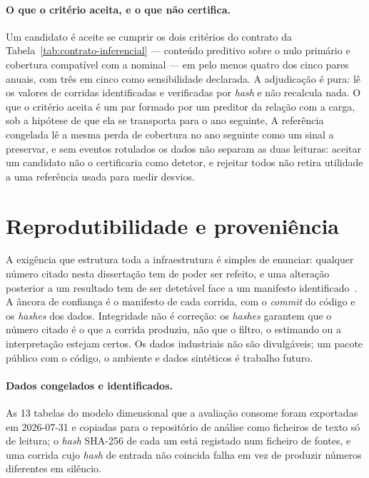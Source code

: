 \paragraph{O que o critério aceita, e o que não certifica.} Um candidato é
aceite se cumprir os dois critérios do contrato da
Tabela~\ref{tab:contrato-inferencial} --- conteúdo preditivo sobre o nulo
primário e cobertura compatível com a nominal --- em pelo menos quatro dos
cinco pares anuais, com três em cinco como sensibilidade declarada. A
adjudicação é pura: lê os valores de corridas identificadas e verificadas por
\emph{hash} e não recalcula nada. O que o critério aceita é um par formado
por um preditor da relação com a carga, sob a hipótese de que ela se
transporta para o ano seguinte,  A referência congelada lê a mesma perda de cobertura no ano
seguinte como um sinal a preservar, e sem eventos rotulados os dados não
separam as duas leituras: aceitar um candidato não o certificaria como
detetor, e rejeitar todos não retira utilidade a uma referência usada para
medir desvios.

\section{Reprodutibilidade e proveniência}
\label{sec:reprodutibilidade}

A exigência que estrutura toda a infraestrutura é simples de enunciar:
qualquer número citado nesta dissertação tem de poder ser refeito, e uma
alteração posterior a um resultado tem de ser detetável face a um manifesto
identificado~\cite{Peng2011,Sandve2013}. A âncora de confiança é o manifesto
de cada corrida, com o \emph{commit} do código e os \emph{hashes} dos dados.
Integridade não é correção: os \emph{hashes} garantem que o número citado é o
que a corrida produziu, não que o filtro, o estimando ou a interpretação
estejam certos. Os dados industriais não são divulgáveis; um pacote público
com o código, o ambiente e dados sintéticos é trabalho futuro.

\paragraph{Dados congelados e identificados.} As 13 tabelas do modelo
dimensional que a avaliação consome foram exportadas em 2026-07-31 e
copiadas para o repositório de análise como ficheiros de texto só de
leitura; o \emph{hash} SHA-256 de cada um está registado num ficheiro de
fontes, e uma corrida cujo \emph{hash} de entrada não coincida falha em vez
de produzir números diferentes em silêncio. 


